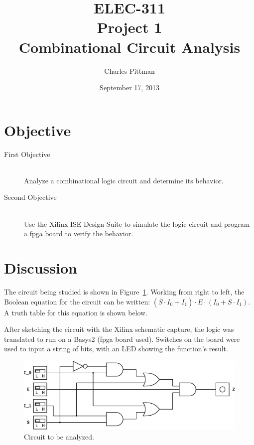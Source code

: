 \documentclass{article}
\author{Charles Pittman}
\title{ELEC-311\\ Project 1\\ Combinational Circuit Analysis}
\date{September 17, 2013}
\begin{document}
\maketitle %

\pagebreak


\renewcommand{\labelenumi}{\alph{enumi}.}

\section{Objective}
\label{sec:objective}

 \begin{description}
 \item[First Objective] \hfill \\
   Analyze a combinational logic circuit and determine its behavior.
 \item[Second Objective] \hfill \\
   Use the Xilinx ISE Design Suite to simulate the logic circuit and
   program a \gls{fpga} board to verify the behavior.
 \end{description}

\section{Discussion}
\label{sec:procedure}

The circuit being studied is shown in Figure~\ref{fig:circuit}.
Working from right to left, the Boolean equation for the circuit can
be written: $(\overline{S} \cdot I_0 + I_1) \cdot E \cdot (I_0 + S
\cdot I_1)$.  A truth table for this equation is shown below.

After sketching the circuit with the Xilinx schematic capture, the
logic was translated to run on a Basys2 (\gls{fpga} board used).
Switches on the board were used to input a string of bits, with an LED
showing the function's result.

\begin{figure}[hbtp]
  \centering
  \includegraphics[width=\textwidth]{img/circuit}
  \caption{Circuit to be analyzed.}
  \label{fig:circuit}
\end{figure}
\end{document}
